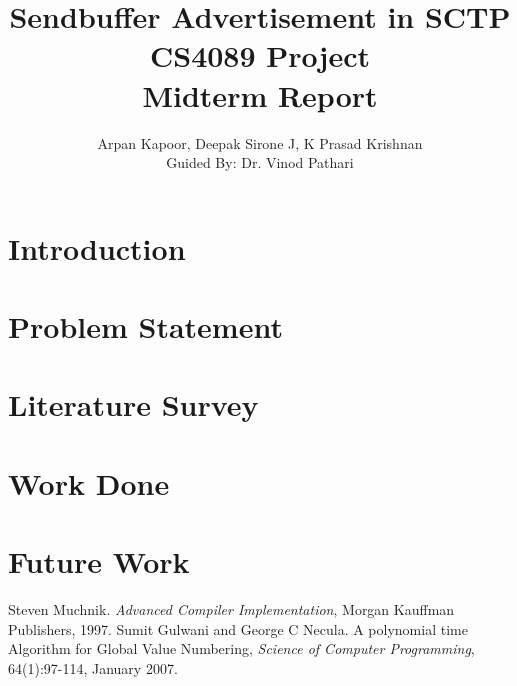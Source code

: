 \documentclass[a4paper,11pt,twocolumn]{article}
\title{Sendbuffer Advertisement in SCTP\\
	{\normalsize CS4089 Project
		\\Midterm Report}}
\author{Arpan Kapoor, Deepak Sirone J, K Prasad Krishnan
	\\Guided By: Dr. Vinod Pathari}
\begin{document}
\maketitle

\section{Introduction}
\section{Problem Statement}
\section{Literature Survey }
\section{Work Done}
\section{Future Work}

\begin{thebibliography}{}
Steven Muchnik. \textit{Advanced Compiler Implementation}, Morgan Kauffman Publishers, 1997.
Sumit Gulwani and George C Necula. A polynomial time Algorithm for Global Value Numbering, \textit{Science of Computer Programming}, 64(1):97-114, January 2007.
\end{thebibliography}{}
\end{document}

